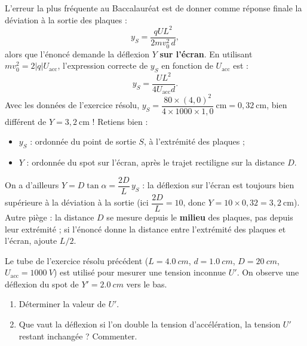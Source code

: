 \documentclass[11pt]{article}
\begin{document}
\begin{attention}
L'erreur la plus fréquente au Baccalauréat est de donner comme réponse finale la déviation à la sortie des plaques :
\[ y_S = \frac{qUL^2}{2mv_0^2\,d}, \]
alors que l'énoncé demande la déflexion $Y$ \textbf{sur l'écran}. En utilisant $mv_0^2 = 2|q|U_{\text{acc}}$, l'expression correcte de $y_S$ en fonction de $U_{\text{acc}}$ est :
\[ y_S = \frac{U L^2}{4 U_{\text{acc}} d}. \]
Avec les données de l'exercice résolu, $y_S = \dfrac{80 \times (4,0)^2}{4 \times 1000 \times 1,0}\ \text{cm} = 0,32\ \text{cm}$, bien différent de $Y = 3,2\ \text{cm}$ ! Retiens bien :
\begin{itemize}
\item $y_S$ : ordonnée du point de sortie $S$, à l'extrémité des plaques ;
\item $Y$ : ordonnée du spot sur l'écran, après le trajet rectiligne sur la distance $D$.
\end{itemize}
On a d'ailleurs $Y = D\tan\alpha = \dfrac{2D}{L}\,y_S$ : la déflexion sur l'écran est toujours bien supérieure à la déviation à la sortie (ici $\dfrac{2D}{L} = 10$, donc $Y = 10 \times 0,32 = 3,2\ \text{cm}$). Autre piège : la distance $D$ se mesure depuis le \textbf{milieu} des plaques, pas depuis leur extrémité ; si l'énoncé donne la distance entre l'extrémité des plaques et l'écran, ajoute $L/2$.
\end{attention}

\begin{exercice}
Le tube de l'exercice résolu précédent ($L = \SI{4,0}{cm}$, $d = \SI{1,0}{cm}$, $D = \SI{20}{cm}$, $U_{\text{acc}} = \SI{1000}{V}$) est utilisé pour mesurer une tension inconnue $U'$. On observe une déflexion du spot de $Y' = \SI{2,0}{cm}$ vers le bas.
\begin{enumerate}
\item Déterminer la valeur de $U'$.
\item Que vaut la déflexion si l'on double la tension d'accélération, la tension $U'$ restant inchangée ? Commenter.
\end{enumerate}
\end{exercice}
\end{document}
